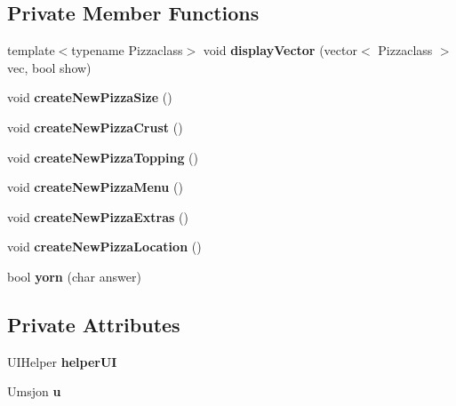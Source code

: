 \subsection*{Private Member Functions}
\begin{CompactItemize}
\item 
\hypertarget{class_umsjon_u_i_f5fa5a8e9efaecd233787825f22c4e76}{
template$<$typename Pizzaclass$>$ void {\bf display\-Vector} (vector$<$ Pizzaclass $>$ vec, bool show)}
\label{class_umsjon_u_i_f5fa5a8e9efaecd233787825f22c4e76}

\item 
\hypertarget{class_umsjon_u_i_2a76c0048b7abe066f689391edd05050}{
void {\bf create\-New\-Pizza\-Size} ()}
\label{class_umsjon_u_i_2a76c0048b7abe066f689391edd05050}

\item 
\hypertarget{class_umsjon_u_i_d82f98afaa60f9b7aa136ac05bbef7d1}{
void {\bf create\-New\-Pizza\-Crust} ()}
\label{class_umsjon_u_i_d82f98afaa60f9b7aa136ac05bbef7d1}

\item 
\hypertarget{class_umsjon_u_i_b6dd1d961e6e445e67f6288bb25e1948}{
void {\bf create\-New\-Pizza\-Topping} ()}
\label{class_umsjon_u_i_b6dd1d961e6e445e67f6288bb25e1948}

\item 
\hypertarget{class_umsjon_u_i_be4b3b11d694731b7018d73e6c617eaa}{
void {\bf create\-New\-Pizza\-Menu} ()}
\label{class_umsjon_u_i_be4b3b11d694731b7018d73e6c617eaa}

\item 
\hypertarget{class_umsjon_u_i_57adf7fe39920c6081db2c3a74aa26b9}{
void {\bf create\-New\-Pizza\-Extras} ()}
\label{class_umsjon_u_i_57adf7fe39920c6081db2c3a74aa26b9}

\item 
\hypertarget{class_umsjon_u_i_a1bdd947ceee8f7069edc6bbc9c508cf}{
void {\bf create\-New\-Pizza\-Location} ()}
\label{class_umsjon_u_i_a1bdd947ceee8f7069edc6bbc9c508cf}

\item 
\hypertarget{class_umsjon_u_i_e1489f835e125c37fb30e595797d971d}{
bool {\bf yorn} (char answer)}
\label{class_umsjon_u_i_e1489f835e125c37fb30e595797d971d}

\end{CompactItemize}
\subsection*{Private Attributes}
\begin{CompactItemize}
\item 
\hypertarget{class_umsjon_u_i_165ca02db075e280199e0970e3465900}{
UIHelper {\bf helper\-UI}}
\label{class_umsjon_u_i_165ca02db075e280199e0970e3465900}

\item 
\hypertarget{class_umsjon_u_i_7b774effe4a349c6dd82ad4f4f21d34c}{
Umsjon {\bf u}}
\label{class_umsjon_u_i_7b774effe4a349c6dd82ad4f4f21d34c}

\end{CompactItemize}


